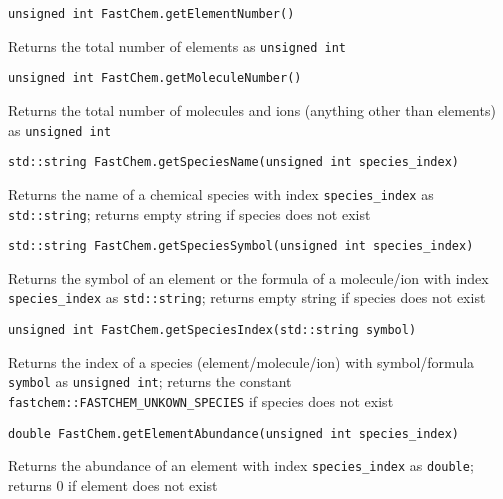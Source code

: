\documentclass[numbers=noenddot]{fcmanual}
\begin{document}
\bigbreak

\lstinline!unsigned int FastChem.getElementNumber()!
\begin{addmargin}[25pt]{0pt}
  Returns the total number of elements as \lstinline!unsigned int!
\end{addmargin}

\bigbreak

\lstinline!unsigned int FastChem.getMoleculeNumber()!
\begin{addmargin}[25pt]{0pt}
  Returns the total number of molecules and ions (anything other than elements) as \lstinline!unsigned int!
\end{addmargin}

\bigbreak

\lstinline!std::string FastChem.getSpeciesName(unsigned int species_index)!
\begin{addmargin}[25pt]{0pt}
  Returns the name of a chemical species with index \lstinline!species_index! as \lstinline!std::string!; returns empty string if species does not exist
\end{addmargin}  

\bigbreak

\lstinline!std::string FastChem.getSpeciesSymbol(unsigned int species_index)!
\begin{addmargin}[25pt]{0pt}
  Returns the symbol of an element or the formula of a molecule/ion with index \lstinline!species_index! as \lstinline!std::string!; returns empty string if species does not exist
\end{addmargin}

\bigbreak

\lstinline!unsigned int FastChem.getSpeciesIndex(std::string symbol)!
\begin{addmargin}[25pt]{0pt}
  Returns the index of a species (element/molecule/ion) with symbol/formula \lstinline!symbol! as \lstinline!unsigned int!; returns the constant \lstinline!fastchem::FASTCHEM_UNKOWN_SPECIES! if species does not exist
\end{addmargin}

\bigbreak

\lstinline!double FastChem.getElementAbundance(unsigned int species_index)!
\begin{addmargin}[25pt]{0pt}
  Returns the abundance of an element with index \lstinline!species_index! as \lstinline!double!; returns 0 if element does not exist
\end{addmargin}


\bigbreak
\end{document}
